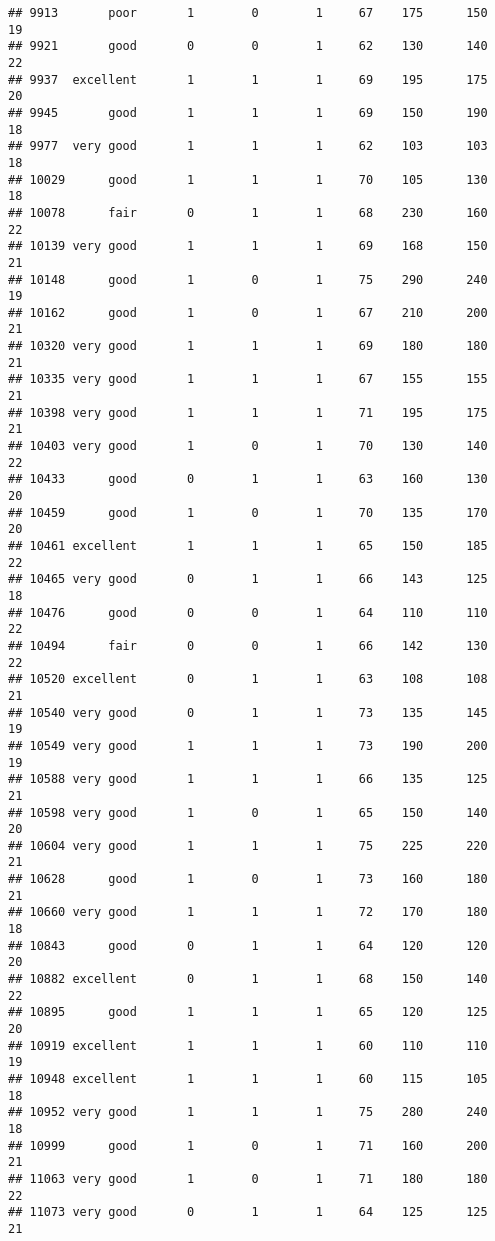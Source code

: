 \documentclass[]{article}
\begin{document}
\begin{verbatim}
## 9913       poor       1        0        1     67    175      150  19
## 9921       good       0        0        1     62    130      140  22
## 9937  excellent       1        1        1     69    195      175  20
## 9945       good       1        1        1     69    150      190  18
## 9977  very good       1        1        1     62    103      103  18
## 10029      good       1        1        1     70    105      130  18
## 10078      fair       0        1        1     68    230      160  22
## 10139 very good       1        1        1     69    168      150  21
## 10148      good       1        0        1     75    290      240  19
## 10162      good       1        0        1     67    210      200  21
## 10320 very good       1        1        1     69    180      180  21
## 10335 very good       1        1        1     67    155      155  21
## 10398 very good       1        1        1     71    195      175  21
## 10403 very good       1        0        1     70    130      140  22
## 10433      good       0        1        1     63    160      130  20
## 10459      good       1        0        1     70    135      170  20
## 10461 excellent       1        1        1     65    150      185  22
## 10465 very good       0        1        1     66    143      125  18
## 10476      good       0        0        1     64    110      110  22
## 10494      fair       0        0        1     66    142      130  22
## 10520 excellent       0        1        1     63    108      108  21
## 10540 very good       0        1        1     73    135      145  19
## 10549 very good       1        1        1     73    190      200  19
## 10588 very good       1        1        1     66    135      125  21
## 10598 very good       1        0        1     65    150      140  20
## 10604 very good       1        1        1     75    225      220  21
## 10628      good       1        0        1     73    160      180  21
## 10660 very good       1        1        1     72    170      180  18
## 10843      good       0        1        1     64    120      120  20
## 10882 excellent       0        1        1     68    150      140  22
## 10895      good       1        1        1     65    120      125  20
## 10919 excellent       1        1        1     60    110      110  19
## 10948 excellent       1        1        1     60    115      105  18
## 10952 very good       1        1        1     75    280      240  18
## 10999      good       1        0        1     71    160      200  21
## 11063 very good       1        0        1     71    180      180  22
## 11073 very good       0        1        1     64    125      125  21

\end{verbatim}
\end{document}
